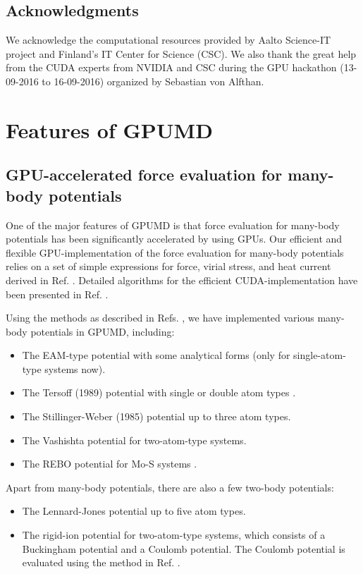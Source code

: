 \documentclass[12pt,a4paper]{report}
\begin{document}
\section{Acknowledgments}
We acknowledge the computational resources provided by Aalto Science-IT project and Finland's IT Center for Science (CSC). We also thank the great help from the CUDA experts from NVIDIA and CSC during the GPU hackathon (13-09-2016 to 16-09-2016) organized by Sebastian von Alfthan.




\chapter{Features of GPUMD}


\section{GPU-accelerated force evaluation for many-body potentials}

One of the major features of GPUMD is that force evaluation for many-body potentials has been significantly accelerated by using GPUs. Our efficient and flexible GPU-implementation of the force evaluation for many-body potentials relies on a set of simple expressions for force, virial stress, and heat current derived in Ref. \cite{fan2015prb}. Detailed algorithms for the efficient CUDA-implementation have been presented in Ref. \cite{fan2017cpc}.

Using the methods as described in Refs. \cite{fan2015prb,fan2017cpc}, we have implemented various many-body potentials in GPUMD, including:
\begin{itemize}
\item The EAM-type potential with some analytical forms \cite{zhou2004prb,dai2006jpcm} (only for single-atom-type systems now).
\item The Tersoff (1989) potential with single or double atom types \cite{tersoff1989prb}.
\item The Stillinger-Weber (1985) potential \cite{stillinger1985prb} up to three atom types.
\item The Vashishta potential \cite{vashishta2007jap} for two-atom-type systems.
\item The REBO potential for Mo-S systems \cite{liang2009prb}.
\end{itemize}

Apart from many-body potentials, there are also a few two-body potentials:
\begin{itemize}
\item The Lennard-Jones potential up to five atom types. 
\item The rigid-ion potential for two-atom-type systems, which consists of a Buckingham potential and a Coulomb potential. The Coulomb potential is evaluated using the method in Ref. \cite{fennell2006jcp}.
\end{itemize}
\end{document}
